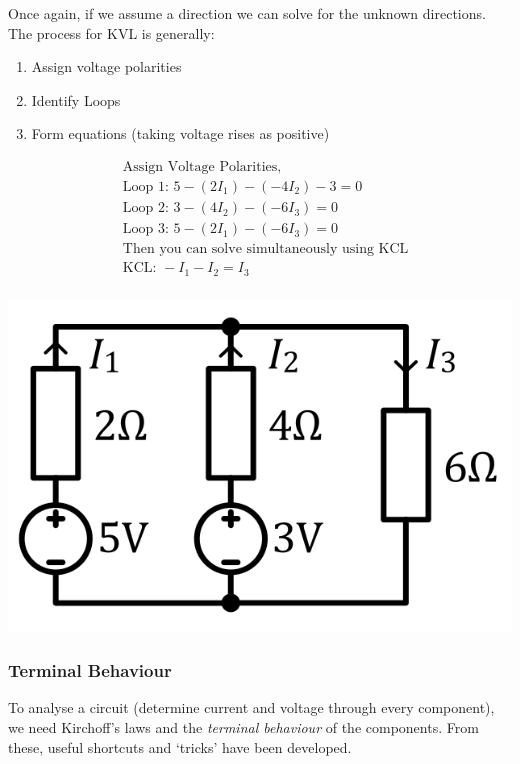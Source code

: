 \documentclass[12pt]{article}
\begin{document}
Once again, if we assume a direction we can solve for the unknown directions.
The process for KVL is generally:

\begin{enumerate}
  \item Assign voltage polarities 
  \item Identify Loops
  \item Form equations (taking voltage rises as positive)
\end{enumerate}
\begin{example}
  \begin{align*}
    &\text{Assign Voltage Polarities,}\\
    &\text{Loop 1: } 5-(2I_1)-(-4I_2)-3=0 \\
    &\text{Loop 2: } 3-(4I_2)-(-6I_3)=0 \\
    &\text{Loop 3: } 5-(2I_1)-(-6I_3)=0 \\
    &\text{Then you can solve simultaneously using KCL} \\
    &\text{KCL: }-I_1 -I_2 = I_3 \\
  \end{align*}
\end{example}
\begin{marginfigure}
  \vspace{-5cm}
  \includegraphics[scale=0.2]{kvl}
\end{marginfigure}

\subsubsection{Terminal Behaviour}
To analyse a circuit (determine current and voltage through every component), we need Kirchoff's laws and the \textit{terminal behaviour} of the components.
From these, useful shortcuts and `tricks' have been developed.
\end{document}
